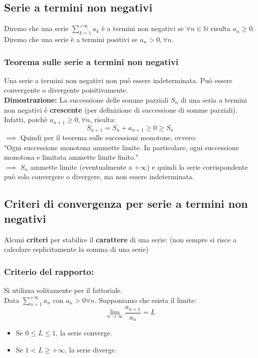 \documentclass[../../main.tex]{subfiles}
\begin{document}
\subsection{Serie a termini non negativi}
Diremo che una serie $\sum_{k=1}^{+\infty}a_k$ è a termini non negativi se
$\forall n\in \mathbb{N}$ risulta $a_n \geq 0$.\\ Diremo che una serie è a
termini positivi se $a_n>0, \forall n$.

\subsubsection{Teorema sulle serie a termini non negativi}
Una serie a termini non negativi non può essere indeterminata. Può essere
convergente o divergente poisitivamente.\\ \textbf{Dimostrazione:} La
successione delle somme parziali $S_n$ di una seria a termini non negativi è
\textbf{crescente} (per definizione di successione di somme parziali).\\
Infatti, poichè $a_{n+1}\geq 0, \forall n$, risulta:
\[
    S_{n+1} = S_n + a_{n+1} \geq 0 \geq S_n
\]
$\implies$ Quindi per il teorema sulle successioni monotone, ovvero:\\
"Ogni successione monotona ammette limite. In particolare, ogni successione monotona e limitata ammette limite finito."\\
$\implies$ $S_n$ ammette limite (eventualmente a $+\infty$) e quindi la serie corrispondente può solo convergere o divergere, ma non essere indeterminata.

\subsection{Criteri di convergenza per serie a termini non negativi}
Alcuni \textbf{criteri} per stabilire il \textbf{carattere} di una serie: (non
sempre si risce a calcolare esplicitamente la somma di una serie)

\subsubsection{Criterio del rapporto:}
Si utilizza solitamente per il fattoriale.\\ Data $\sum_{n=1}^{+\infty}a_n$ con
$a_n > 0 \forall n$. Supponiamo che esista il limite:
\[
    \lim_{n\to\infty}\dfrac{a_{n+1}}{a_n} = L
\]
\begin{itemize}
    \item Se $0\leq L \leq 1$, la serie converge.
    \item Se $1 < L \geq +\infty$, la serie diverge.
\end{itemize}
\end{document}
